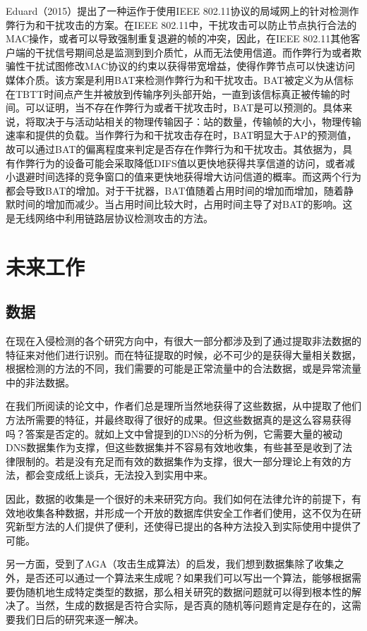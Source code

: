 \documentclass[12pt]{article} %
\begin{document}
Eduard（2015）提出了一种运作于使用IEEE 802.11协议的局域网上的针对检测作弊行为和干扰攻击的方案。在IEEE 802.11中，干扰攻击可以防止节点执行合法的MAC操作，或者可以导致强制重复退避的帧的冲突，因此，在IEEE 802.11其他客户端的干扰信号期间总是监测到到介质忙，从而无法使用信道。而作弊行为或者欺骗性干扰试图修改MAC协议的约束以获得带宽增益，使得作弊节点可以快速访问媒体介质。该方案是利用BAT来检测作弊行为和干扰攻击。BAT被定义为从信标在TBTT时间点产生并被放到传输序列头部开始，一直到该信标真正被传输的时间。可以证明，当不存在作弊行为或者干扰攻击时，BAT是可以预测的。具体来说，将取决于与活动站相关的物理传输因子：站的数量，传输帧的大小，物理传输速率和提供的负载。当作弊行为和干扰攻击存在时，BAT明显大于AP的预测值，故可以通过BAT的偏离程度来判定是否存在作弊行为和干扰攻击。其依据为，具有作弊行为的设备可能会采取降低DIFS值以更快地获得共享信道的访问，或者减小退避时间选择的竞争窗口的值来更快地获得增大访问信道的概率。而这两个行为都会导致BAT的增加。对于干扰器，BAT值随着占用时间的增加而增加，随着静默时间的增加而减少。当占用时间比较大时，占用时间主导了对BAT的影响。这是无线网络中利用链路层协议检测攻击的方法。

\section{未来工作}
\label{future}

\subsection{数据}
\label{data}

在现在入侵检测的各个研究方向中，有很大一部分都涉及到了通过提取非法数据的特征来对他们进行识别。而在特征提取的时候，必不可少的是获得大量相关数据，根据检测的方法的不同，我们需要的可能是正常流量中的合法数据，或是异常流量中的非法数据。

在我们所阅读的论文中，作者们总是理所当然地获得了这些数据，从中提取了他们方法所需要的特征，并最终取得了很好的成果。但这些数据真的是这么容易获得吗？答案是否定的。就如上文中曾提到的DNS的分析为例，它需要大量的被动DNS数据集作为支撑，但这些数据集并不容易有效地收集，有些甚至是收到了法律限制的。若是没有充足而有效的数据集作为支撑，很大一部分理论上有效的方法，都会变成纸上谈兵，无法投入到实用中来。

因此，数据的收集是一个很好的未来研究方向。我们如何在法律允许的前提下，有效地收集各种数据，并形成一个开放的数据库供安全工作者们使用，这不仅为在研究新型方法的人们提供了便利，还使得已提出的各种方法投入到实际使用中提供了可能。

另一方面，受到了AGA（攻击生成算法）的启发，我们想到数据集除了收集之外，是否还可以通过一个算法来生成呢？如果我们可以写出一个算法，能够根据需要伪随机地生成特定类型的数据，那么相关研究的数据问题就可以得到根本性的解决了。当然，生成的数据是否符合实际，是否真的随机等问题肯定是存在的，这需要我们日后的研究来逐一解决。
\end{document}
